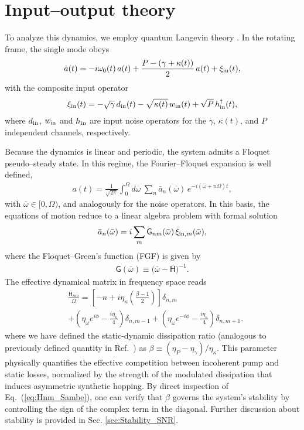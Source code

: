 \documentclass[a4paper,twocolumn,floatfix,10pt,superscriptaddress]%
{quantumarticle}
\newcommand{\msf}[1]{\mathsf{#1}}
\newcommand{\bomega}{{\bar{\omega}}}
\newcommand{\rmin}{{{\rm in}}}
\begin{document}
\section{Input--output theory} 
\label{sec:I-O_theory}To analyze this dynamics, we employ quantum Langevin theory \cite{Ramos2021}. In the rotating frame, the single mode obeys
\begin{align}
\dot{a}(t) = -i \omega_0(t)\, a(t) 
+ \frac{P -(\gamma+ \kappa(t))}{2}\, a(t)
+ \xi_\rmin(t), \label{eq:adot}
\end{align}
with the composite input operator
\begin{align}
    \xi_\rmin(t) = - \sqrt{\gamma}\, d_\rmin(t)- \sqrt{\kappa(t)}\, w_\rmin(t) +\sqrt{P}\, h_\rmin^\dagger(t),
\end{align} where $d_\rmin$, $w_\rmin$ and $h_\rmin$ are input noise operators for the $\gamma$, $\kappa(t)$, and $P$ independent channels, respectively.

Because the dynamics is linear and periodic, the system admits a Floquet pseudo--steady state. In this regime, the Fourier--Floquet expansion is well defined,
\begin{align}
a(t) = \frac{1}{\sqrt{2\pi}}\int_0^{\Omega} d\bomega\; \sum_{n} \bar{a}_n(\bomega) \,
e^{-i(\bomega + n \Omega) t},\label{eq:at_a_n_bomega}
\end{align}
with $\bomega\in[0,\Omega)$, and analogously for the noise operators. In this basis, the equations of motion reduce to a linear algebra problem with formal solution \begin{align}
    \bar{a}_n(\bomega) 
= i \sum_m \msf{G}_{nm}(\bomega)\, \bar{\xi}_{\rmin,m}(\bomega),
\end{align} 
where the Floquet--Green's function (FGF) is given by
\begin{eqnarray}
    \msf{G}(\bomega) \equiv \big(\bomega - \bar{\mathsf H}\big)^{-1}.
\end{eqnarray}
The effective dynamical matrix in frequency space reads
\begin{align}\label{eq:Hnm_Sambe}
    &\frac{\bar{\mathsf{H}}_{n m}}{\Omega} = \left[ - n
+ i\eta_\kappa\left( \frac{\beta-1}{2} \right) \right] \delta_{n,m} \\
&+\left( \eta_\omega e^{i\phi} - \frac{i \eta_\kappa}{4} \right)\delta_{n,m-1}
+ \left( \eta_\omega e^{-i\phi} - \frac{i \eta_\kappa}{4}\right)\delta_{n,m+1}.\nonumber
\end{align}
where we have defined the static-dynamic dissipation ratio (analogous to previously defined quantity in Ref.~\cite{wanjura2020topological}) as $\beta\equiv(\eta_P-\eta_\gamma)/\eta_\kappa$. This parameter physically quantifies the effective competition between incoherent pump and static losses, normalized by the strength of the modulated dissipation that induces asymmetric synthetic hopping. By direct inspection of Eq.~(\ref{eq:Hnm_Sambe}), one can verify that $\beta$ governs the system’s stability by controlling the sign of the complex term in the diagonal. Further discussion about stability is provided in Sec. \ref{sec:Stability_SNR}.
\end{document}

